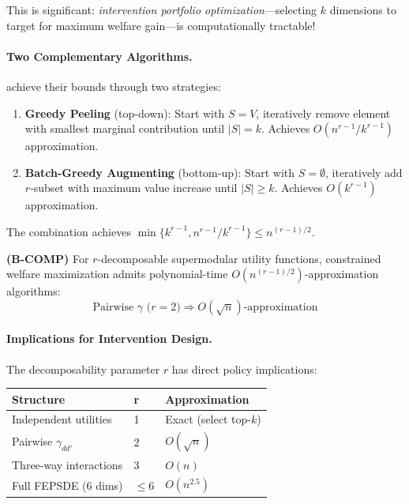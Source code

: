 This is significant: \emph{intervention portfolio optimization}---selecting $k$ 
dimensions to target for maximum welfare gain---is computationally tractable!

\paragraph{Two Complementary Algorithms.}

\citet{chen2025supermodular} achieve their bounds through two strategies:

\begin{enumerate}
    \item \textbf{Greedy Peeling} (top-down): Start with $S = V$, iteratively remove 
    element with smallest marginal contribution until $|S| = k$. Achieves 
    $O(n^{r-1}/k^{r-1})$ approximation.
    
    \item \textbf{Batch-Greedy Augmenting} (bottom-up): Start with $S = \emptyset$, 
    iteratively add $r$-subset with maximum value increase until $|S| \geq k$. 
    Achieves $O(k^{r-1})$ approximation.
\end{enumerate}

The combination achieves $\min\{k^{r-1}, n^{r-1}/k^{r-1}\} \leq n^{(r-1)/2}$.

\begin{axiom}
\label{ax:B-COMP}
\textbf{(B-COMP)} For $r$-decomposable supermodular utility functions, constrained 
welfare maximization admits polynomial-time $O(n^{(r-1)/2})$-approximation algorithms:
\begin{equation}
    \text{Pairwise } \gamma \text{ (}r=2\text{)} \Rightarrow O(\sqrt{n})\text{-approximation}
\end{equation}
\end{axiom}

\paragraph{Implications for Intervention Design.}

The decomposability parameter $r$ has direct policy implications:

\begin{center}
\begin{tabular}{lll}
\toprule
\textbf{Structure} & \textbf{r} & \textbf{Approximation} \\
\midrule
Independent utilities & 1 & Exact (select top-$k$) \\
Pairwise $\gamma_{dd'}$ & 2 & $O(\sqrt{n})$ \\
Three-way interactions & 3 & $O(n)$ \\
Full FEPSDE (6 dims) & $\leq 6$ & $O(n^{2.5})$ \\
\bottomrule
\end{tabular}
\end{center}

